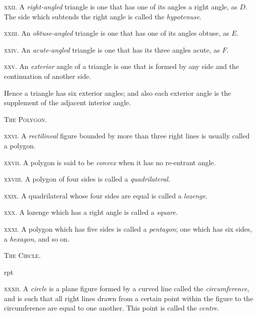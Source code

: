 \documentclass[oneside]{book}
\newcounter{wrapwidth}
\newcommand\imgflow[3]{
\setcounter{wrapwidth}{#1}

\begin{wrapfigure}[#2]{r}{\value{wrapwidth}pt}
\begin{center}
\vspace{-0.3in}

\end{center}
\end{wrapfigure}
}
\newcommand\imgcent[2]{
\begin{center}

\end{center}
}
\begin{document}
\imgcent{233}{f007}

\textsc{xxii}. A \textit{right-angled} triangle is one that has one of
its angles a right angle, as $D$. The side which subtends
the right angle is called the \textit{hypotenuse}.

\textsc{xxiii}. An \textit{obtuse-angled} triangle is one that has one
of its angles obtuse, as $E$.

\textsc{xxiv}. An \textit{acute-angled} triangle is one that has its three
angles acute, as $F$.


\imgcent{233}{f008}

\textsc{xxv}. An \textit{exterior} angle of a triangle is one that is
formed by any side and the continuation of another
side.

\begin{footnotesize}
Hence a triangle has six exterior angles; and also each exterior
angle is the supplement of the adjacent interior angle.
\par\end{footnotesize}


\begin{center}
\textsc{The Polygon.}
\end{center}

\textsc{xxvi}. A \textit{rectilineal} figure bounded by more than three
right lines is usually called a polygon.

\textsc{xxvii}. A polygon is said to be \textit{convex} when it has no
re-entrant angle.


\textsc{xxviii}. A polygon of four sides is called a \textit{quadrilateral}.

\textsc{xxix}. A quadrilateral whose four sides are equal is
called a \textit{lozenge}.

\textsc{xxx}. A lozenge which has a right angle is called a
\textit{square}.

\textsc{xxxi}. A polygon which has five sides is called a
\textit{pentagon}; one which has six sides, a \textit{hexagon}, and so on.


\begin{center}
\textsc{The Circle.}
\end{center}


\imgflow{95}{7}{f009}
\textsc{xxxii}. A \textit{circle} is a plane figure formed by a curved
line called the \textit{circumference}, and is
such that all right lines drawn
from a certain point within the
figure to the circumference are
equal to one another. This point
is called the \textit{centre}.
\end{document}
